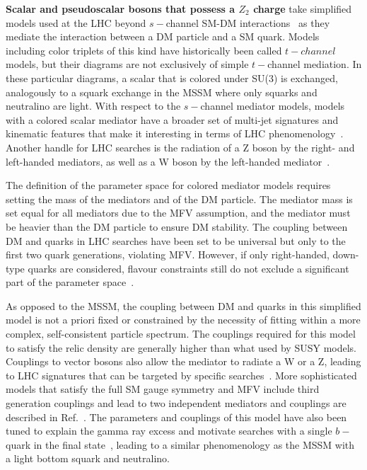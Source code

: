 \textbf{Scalar and pseudoscalar bosons that possess a $Z_2$ charge} take simplified models used at the LHC beyond $s-$channel SM-DM interactions~\cite{Bai:2013iqa, Papucci:2014iwa, An:2013xka, Bell:2012rg} as they mediate the interaction between a DM particle and a SM quark. Models including color triplets of this kind have historically been called $t-channel$ models, but their diagrams are not exclusively of simple $t-$channel mediation. In these particular diagrams, a scalar that is colored under SU(3) is exchanged, analogously to a squark exchange in the MSSM where only squarks and neutralino are light.
With respect to the $s-$channel mediator models, models with a colored scalar mediator have a broader set of multi-jet signatures and kinematic features that make it interesting in terms of LHC phenomenology~\cite{Abercrombie:2015wmb}. %
Another handle for LHC searches is the radiation of a Z boson by the right- and left-handed mediators, as well as a W boson by the left-handed mediator~\cite{Bell:2012rg}. 

The definition of the parameter space for colored mediator models requires setting the mass of the mediators and of the DM particle. The mediator mass is set equal for all mediators due to the MFV assumption, and the mediator must be heavier than the DM particle to ensure DM stability. 
The coupling between DM and quarks \gdmq in LHC searches have been set to be universal but only to the first two quark generations, violating MFV. 
However, if only right-handed, down-type quarks are considered, flavour constraints still do not exclude a significant part of the parameter space~\cite{Abercrombie:2015wmb}. 

As opposed to the MSSM, the coupling between DM and quarks in this simplified model is not a priori fixed or constrained by the necessity of fitting within a more complex, self-consistent particle spectrum. The couplings required for this model to satisfy the relic density are generally higher than what used by SUSY models. 
Couplings to vector bosons also allow the mediator to radiate a W or a Z, leading to LHC signatures that can be targeted by specific searches~\cite{Bell:2012rg}. 
More sophisticated models that satisfy the full SM gauge symmetry and MFV include third generation couplings and lead to two independent mediators and couplings are described in Ref.~\cite{Ko:2016zxg}. 
The parameters and couplings of this model have also been tuned to explain the gamma ray excess and motivate searches with a single $b-$quark in the final state~\cite{Agrawal:2014una}, leading to a similar phenomenology as the MSSM with a light bottom squark and neutralino. 


